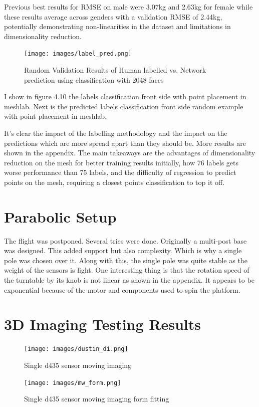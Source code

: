 Previous best results for RMSE on male were 3.07kg and 2.63kg for female while these results average across genders with a validation RMSE of 2.44kg, potentially demonstrating non-linearities in the dataset and limitations in dimensionality reduction.


\begin{figure}[!htb]
	\caption{Random Validation Results of Human labelled vs. Network prediction using classification with 2048 faces}
	\centering
	\texttt{[image: images/label\_pred.png]}
\end{figure}

I show in figure 4.10 the labels classification front side with point placement in meshlab. Next is the predicted labels classification front side random example with point placement in meshlab.

It's clear the impact of the labelling methodology and the impact on the predictions which are more spread apart than they should be. More results are shown in the appendix. The main takeaways are the advantages of dimensionality reduction on the mesh for better training results initially, how 76 labels gets worse performance than 75 labels, and the difficulty of regression to predict points on the mesh, requiring a closest points classification to top it off.

\section{Parabolic Setup}
The flight was postponed. Several tries were done. Originally a multi-post base was designed. This added support but also complexity. Which is why a single pole was chosen over it. Along with this, the single pole was quite stable as the weight of the sensors is light. One interesting thing is that the rotation speed of the turntable by its knob is not linear as shown in the appendix. It appears to be exponential because of the motor and components used to spin the platform.

\section{3D Imaging Testing Results}

\begin{figure}[!htb]
	\caption{Single d435 sensor moving imaging}
	\centering
	\texttt{[image: images/dustin\_di.png]}
\end{figure}

\begin{figure}[!htb]
	\caption{Single d435 sensor moving imaging form fitting}
	\centering
	\texttt{[image: images/mw\_form.png]}
\end{figure}


